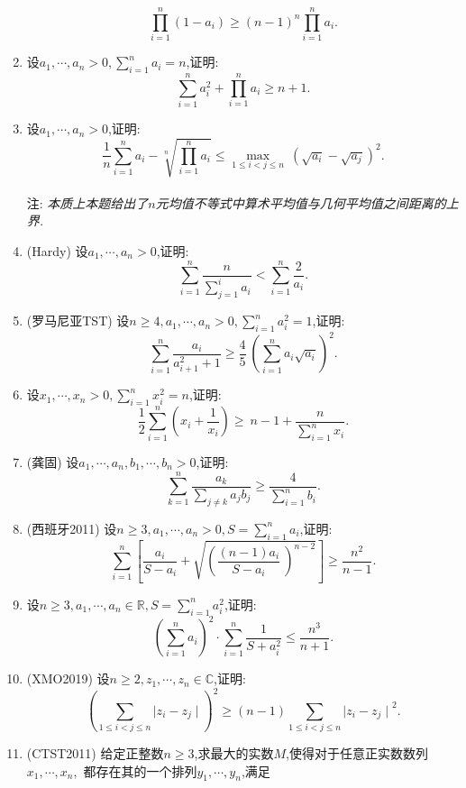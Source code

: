 \documentclass{article}
\begin{document}
\begin{enumerate}
            $$\prod_{i=1}^n{\left( 1-a_i \right)} \ge {\left( n-1 \right)}^n\prod_{i=1}^n {a_i}.$$
        \item 设$a_1,\cdots,a_n>0,\sum_{i=1}^n{a_i}=n$,证明:\ 
            $$\sum_{i=1}^n{a_i^2}+\prod_{i=1}^n{a_i}\ge n+1.$$
        \item 设$a_1,\cdots,a_n>0$,证明:\ 
            $$\frac{1}{n}\sum_{i=1}^n{a_i}-\sqrt[n]{\prod_{i=1}^n{a_i}}\le \max_{1\le i<j \le n} \ 
                {\left( \sqrt{a_i} - \sqrt{a_j} \right)}^2.$$
            \\ 注: \emph {本质上本题给出了$n$元均值不等式中算术平均值与几何平均值之间距离的上界.}
        \item (Hardy) 设$a_1,\cdots,a_n>0$,证明:\ 
            $$\sum_{i=1}^n\frac{n}{\sum_{j=1}^{i}{a_i}}<\sum_{i=1}^n{\frac{2}{a_i}}.$$
        \item (罗马尼亚TST) 设$n\ge4,a_1,\cdots,a_n>0,\sum_{i=1}^n{a_i^2}=1$,证明:\ 
            $$\sum_{i=1}^n{\frac{a_i}{a_{i+1}^2+1}}\ge\frac{4}{5}\ 
            {\left( \sum_{i=1}^n{a_i \sqrt{a_i}}\right)}^2.$$
        \item 设$x_1,\cdots,x_n>0,\sum_{i=1}^n{x_i^2}=n$,证明: \ 
            $$\frac{1}{2}\sum_{i=1}^n{\left( x_i+\frac{1}{x_i} \right)}\ge \ 
                n-1+\frac{n}{\sum_{i=1}^{n}{x_i}}.$$
        \item (龚固) 设$a_1,\cdots,a_n,b_1,\cdots,b_n>0$,证明:\ 
            $$\sum_{k=1}^n{\frac{a_k}{\sum_{j \ne k}{a_j b_j}}}\ge\frac{4}{\sum_{i=1}^n{b_i}}.$$
        \item (西班牙2011) 设$n\ge3,a_1,\cdots,a_n>0,S=\sum_{i=1}^n{a_i}$,证明: \ 
            $${\sum_{i = 1}^{n}\left\lbrack {\frac{a_{i}}{S - a_{i}} + \sqrt{\left( \frac{\left( {n - 1} \right)a_{i}}{S - a_{i}} \
             \right)^{n - 2}}} \right\rbrack} \geq \frac{n^{2}}{n - 1}.$$
        \item 设$n\ge3,a_1,\cdots,a_n\in\mathbb{R},S=\sum_{i=1}^n{a_i^2}$,证明: \ 
            $${\left( \sum_{i=1}^n{a_i} \right)}^2\cdot\sum_{i=1}^n{\frac{1}{S+a_i^2}}\leq\frac{n^3}{n+1}.$$
        \item (XMO2019) 设$n\ge2,z_1,\cdots,z_n\in\mathbb{C}$,证明: \ 
            $${\left( \sum_{1\le i<j \le n}{\mid z_i - z_j \mid}\right)}^2\geq(n-1)\sum_{1\le i<j \le n}{{\mid z_i - z_j \mid}^2}.$$
        \item (CTST2011) 给定正整数$n\ge3$,求最大的实数$M$,使得对于任意正实数数列$x_1,\cdots,x_n$,\
            都存在其的一个排列$y_1,\cdots,y_n$,满足\ 

\end{enumerate}
\end{document}
